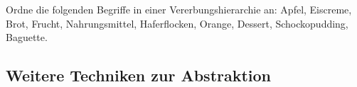 \begin{Exercise}[%
title={Vererbungshierarchie},
label={ex:inheritance-tree}]

    Ordne die folgenden Begriffe in einer Vererbungshierarchie an: Apfel, Eiscreme, Brot,
    Frucht, Nahrungsmittel, Haferflocken, Orange, Dessert, Schockopudding, Baguette.
    
\end{Exercise}


\subsection{Weitere Techniken zur Abstraktion}
\label{subsec:interfaces}


